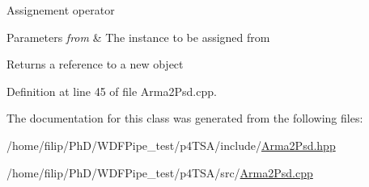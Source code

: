 Assignement operator


\begin{DoxyParams}{Parameters}
{\em from} & The instance to be assigned from\\
\hline
\end{DoxyParams}
\begin{DoxyReturn}{Returns}
a reference to a new object 
\end{DoxyReturn}


Definition at line 45 of file Arma2\+Psd.\+cpp.



The documentation for this class was generated from the following files\+:\begin{DoxyCompactItemize}
\item 
/home/filip/\+Ph\+D/\+W\+D\+F\+Pipe\+\_\+test/p4\+T\+S\+A/include/\hyperlink{_arma2_psd_8hpp}{Arma2\+Psd.\+hpp}\item 
/home/filip/\+Ph\+D/\+W\+D\+F\+Pipe\+\_\+test/p4\+T\+S\+A/src/\hyperlink{_arma2_psd_8cpp}{Arma2\+Psd.\+cpp}\end{DoxyCompactItemize}
